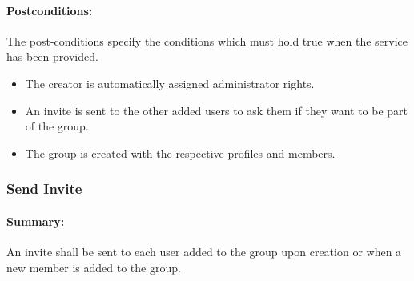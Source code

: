 \documentclass[11pt]{article}
\begin{document}
\paragraph{{Postconditions:}}The post-conditions specify the conditions which must hold true when the service has been provided.
\begin{itemize}
\item	The creator is automatically assigned administrator rights.
\item	An invite is sent to the other added users to ask them if they want to be part of the group.
\item	The group is created with the respective profiles and members.
\end{itemize}
 

\subsubsection{Send Invite} \label{UC-send-invite}
\paragraph{Summary:} An invite shall be sent to each user added to the group upon creation or when a new member is added to the group.
\end{document}
